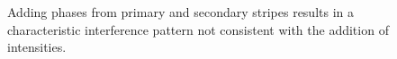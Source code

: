 \begin{figure}
\centering
{}
\caption{Adding phases from primary and secondary stripes results in a
characteristic interference pattern not consistent with the addition of
intensities.}
\label{fig:sumsq}
\end{figure}

